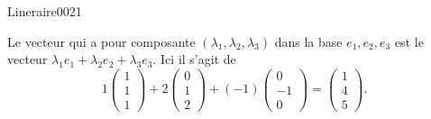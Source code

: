 \begin{corrige}{Lineraire0021}

	Le vecteur qui a pour composante $(\lambda_1,\lambda_2,\lambda_3)$ dans la base $e_1,e_2,e_3$ est le vecteur $\lambda_1e_1+\lambda_2e_2+\lambda_3e_3$. Ici il s'agit de
	\begin{equation}
		1\begin{pmatrix}
			1	\\ 
			1	\\ 
			1	
		\end{pmatrix}+2\begin{pmatrix}
			0	\\ 
			1	\\ 
			2	
		\end{pmatrix}+(-1)\begin{pmatrix}
			0	\\ 
			-1	\\ 
			0	
		\end{pmatrix}=\begin{pmatrix}
			1	\\ 
			4	\\ 
			5	
		\end{pmatrix}.
	\end{equation}
	

\end{corrige}
